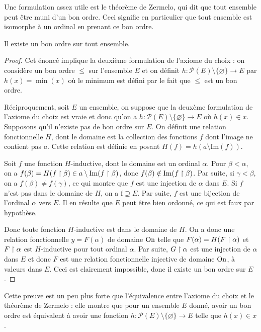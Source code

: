 Une formulation assez utile est le théorème de Zermelo, qui dit que tout ensemble peut être muni d'un bon ordre. Ceci signifie en particulier que tout ensemble est isomorphe à un ordinal en prenant ce bon ordre.

\begin{them}[Zermelo]
    Il existe un bon ordre sur tout ensemble.
\end{them}

\begin{proof}
    Cet énoncé implique la deuxième formulation de l'axiome du choix : on considère un bon ordre $\leq$ sur l'ensemble $E$ et on définit $h : \mathcal P(E) \setminus \{\varnothing\} \to E$ par $h(x) = \min(x)$ où le minimum est défini par le fait que $\leq$ est un bon ordre.

    Réciproquement, soit $E$ un ensemble, on suppose que la deuxème formulation de l'axiome du choix est vraie et donc qu'on a $h : \mathcal P(E)\setminus \{\varnothing \}\to E$ où $h(x)\in x$. Supposons qu'il n'existe pas de bon ordre sur $E$. On définit une relation fonctionnelle $H$, dont le domaine est la collection des fonctions $f$ dont l'image ne contient pas $a$. Cette relation est définie en posant $H(f) = h(a\setminus \mathrm{Im}(f))$.

    Soit $f$ une fonction $H$-inductive, dont le domaine est un ordinal $\alpha$. Pour $\beta < \alpha$, on a $f(\beta) = H(f\upharpoonright\beta)\in a\setminus \mathrm{Im}(f\upharpoonright\beta)$, donc $f(\beta)\notin \mathrm{Im}(f\upharpoonright\beta)$. Par suite, si $\gamma < \beta$, on a $f(\beta) \neq f(\gamma)$, ce qui montre que $f$ est une injection de $\alpha$ dans $E$. Si $f$ n'est pas dans le domaine de $H$, on a $\mathrm{f}\supseteq E$. Par suite, $f$ est une bijection de l'ordinal $\alpha$ vers $E$. Il en résulte que $E$ peut être bien ordonné, ce qui est faux par hypothèse.

    Donc toute fonction $H$-inductive est dans le domaine de $H$. On a donc une relation fonctionnelle $y = F(\alpha)$ de domaine $\mathrm{On}$ telle que $F(\alpha) = H(F\upharpoonright\alpha)$ et $F\upharpoonright\alpha$ est $H$-inductive pour tout ordinal $\alpha$. Par suite, $G\upharpoonright\alpha$ est une injection de $\alpha$ dans $E$ et donc $F$ est une relation fonctionnelle injective de domaine $\mathrm{On}$, à valeurs dans $E$. Ceci est clairement impossible, donc il existe un bon ordre sur $E$.
\end{proof}

\begin{rmk}
    Cette preuve est un peu plus forte que l'équivalence entre l'axiome du choix et le théorème de Zermelo : elle montre que pour un ensemble $E$ donné, avoir un bon ordre est équivalent à avoir une fonction $h : \mathcal P(E)\setminus\{\varnothing\}\to E$ telle que $h(x)\in x$.
\end{rmk}

